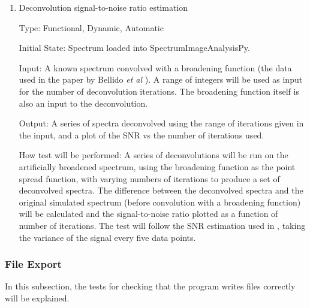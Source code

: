 \documentclass[12pt, titlepage]{article}
\newcommand{\progname}{SpectrumImageAnalysisPy}
\begin{document}
\begin{enumerate}
\item{Deconvolution signal-to-noise ratio estimation}
\label{TFR:RLSNR}

Type: Functional, Dynamic, Automatic
					
Initial State: Spectrum loaded into \progname{}.

Input: A known spectrum convolved with a broadening function (the data used in
the paper by Bellido \textit{et al} \cite{bellido_toward_2014}). A range of
integers will be used as input for the number of deconvolution iterations. The
broadening function itself is also an input to the deconvolution.

Output: A series of spectra deconvolved using the range of iterations given in
the input, and a plot of the SNR vs the number of iterations used.
					
How test will be performed: A series of deconvolutions will be run on the
artificially broadened spectrum, using the broadening function as the point
spread function, with varying numbers of iterations to produce a set of
deconvolved spectra. The difference between the deconvolved spectra and the
original simulated spectrum (before convolution with a broadening function) will
be calculated and the signal-to-noise ratio plotted as a function of number of
iterations. The test will follow the SNR estimation used in
\cite{bellido_toward_2014}, taking the variance of the signal every five data
points.\\

\end{enumerate}

\subsubsection{File Export}
In this subsection, the tests for checking that the program writes files
correctly will be explained.
\end{document}
